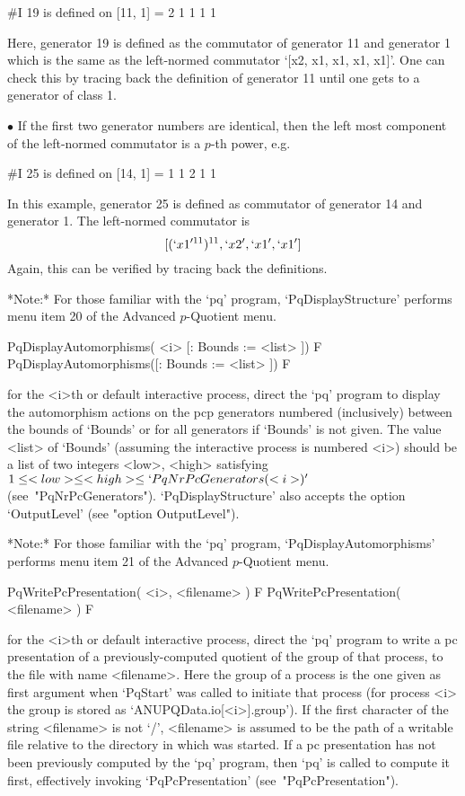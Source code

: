 \begintt
#I  19 is defined on [11, 1] = 2 1 1 1 1    
\endtt
        
Here, generator 19 is defined as  the  commutator  of  generator  11  and
generator  1  which  is  the   same   as   the   left-normed   commutator
`[x2, x1, x1, x1, x1]'. One can check this by tracing back the definition
of generator 11 until one gets to a generator of class 1.


\item{$\bullet$}
If the first two generator numbers are identical, then the left most
component of the left-normed commutator is a $p$-th power, e.g.

\begintt
#I  25 is defined on [14, 1] = 1 1 2 1 1 
\endtt

In this example, generator 25 is defined as commutator  of  generator  14
and generator 1. The left-normed commutator is
$$
[(`x1'^{11})^{11}, `x2', `x1', `x1']
$$
Again, this can be verified by tracing back the definitions.

\endlist

*Note:*
For those familiar with the `pq'  program,  `PqDisplayStructure'  performs
menu item 20 of the Advanced $p$-Quotient menu.

\>PqDisplayAutomorphisms( <i> [: Bounds := <list> ]) F
\>PqDisplayAutomorphisms([: Bounds := <list> ]) F

for the <i>th or default interactive {\ANUPQ} process,  direct  the  `pq'
program to display the automorphism actions on the pcp generators numbered
(inclusively) between the bounds of `Bounds' or  for  all  generators  if
`Bounds' is not  given.  The  value  <list>  of  `Bounds'  (assuming  the
interactive process is numbered <i>) should be a  list  of  two  integers
<low>,   <high>   satisfying   $1    \le    <low>    \le    <high>    \le
`PqNrPcGenerators(<i>)'$  (see~"PqNrPcGenerators").  `PqDisplayStructure'
also accepts the option `OutputLevel' (see "option OutputLevel").

*Note:*
For  those  familiar  with  the  `pq'  program,   `PqDisplayAutomorphisms'
performs menu item 21 of the Advanced $p$-Quotient menu.

\>PqWritePcPresentation( <i>, <filename> ) F
\>PqWritePcPresentation( <filename> ) F

for the <i>th or default interactive {\ANUPQ} process,  direct  the  `pq'
program to write a pc presentation of a previously-computed  quotient  of
the group of that process, to the file with  name  <filename>.  Here  the
group of a process is the one given as first argument when `PqStart'  was
called to initiate that process (for process <i> the group is  stored  as
`ANUPQData.io[<i>].group').  If  the  first  character  of   the   string
<filename> is not `/', <filename> is assumed to be the path of a writable
file relative to the directory in which  {\GAP}  was  started.  If  a  pc
presentation has not been previously computed by the `pq'  program,  then
`pq'   is   called   to   compute   it   first,   effectively    invoking
`PqPcPresentation' (see~"PqPcPresentation").

